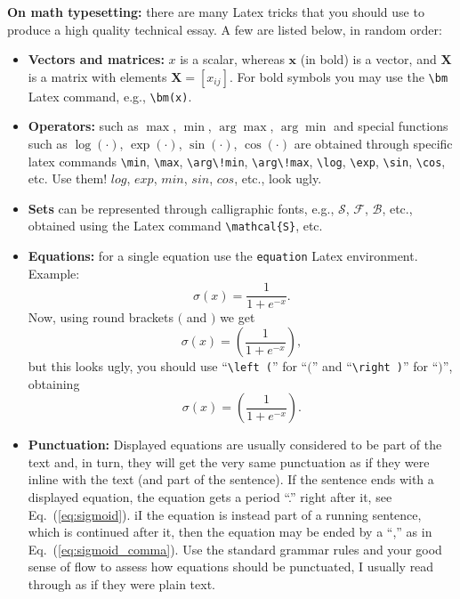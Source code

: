 \noindent \textbf{On math typesetting:} there are many Latex tricks that you should use to produce a high quality technical essay. A few are listed below, in random order:
\begin{itemize}
\item \textbf{Vectors and matrices:} $x$ is a scalar, whereas $\bm{x}$ (in bold) is a vector, and $\bm{X}$ is a matrix with elements $\bm{X} = [x_{ij}]$. For bold symbols you may use the \texttt{\textbackslash bm} Latex command, e.g., \texttt{\textbackslash bm(x)}.
\item \textbf{Operators:} such as $\max$, $\min$, $\arg\!\max$, $\arg\!\min$ and special functions such as $\log(\cdot)$, $\exp(\cdot)$, $\sin(\cdot)$, $\cos(\cdot)$ are obtained through specific latex commands \texttt{\textbackslash min}, \texttt{\textbackslash max}, \texttt{\textbackslash arg\textbackslash!min}, \texttt{\textbackslash arg\textbackslash!max}, \texttt{\textbackslash log}, \texttt{\textbackslash exp}, \texttt{\textbackslash sin}, \texttt{\textbackslash cos}, etc. Use them! $log$, $exp$, $min$, $sin$, $cos$, etc., look ugly.
\item \textbf{Sets} can be represented through calligraphic fonts, e.g., $\mathcal{S}$, $\mathcal{F}$, $\mathcal{B}$, etc., obtained using the Latex command \texttt{\textbackslash mathcal{\{S\}}}, etc.
\item \textbf{Equations:} for a single equation use the \texttt{equation} Latex environment. Example: 
\begin{equation}
\label{eq:sigmoid}
\sigma(x) = \frac{1}{1+e^{-x}}.
\end{equation} 
Now, using round brackets $($ and $)$ we get
\begin{equation}
\label{eq:sigmoid_comma}
\sigma(x) = (\frac{1}{1+e^{-x}}),
\end{equation} 
but this looks ugly, you should use ``\texttt{\textbackslash left (}'' for ``$($'' and ``\texttt{\textbackslash right )}'' for ``$)$'', obtaining
\begin{equation}
\sigma(x) = \left ( \frac{1}{1+e^{-x}} \right ).
\end{equation} 
\item \textbf{Punctuation:} Displayed equations are usually considered to be part of the text and, in turn, they will get the very same punctuation as if they were inline with the text (and part of the sentence). If the sentence ends with a displayed equation, the equation gets a period ``.'' right after it, see Eq.~(\ref{eq:sigmoid}). iI the equation is instead part of a running sentence, which is continued after it, then the equation may be ended by a ``,'' as in Eq.~(\ref{eq:sigmoid_comma}). Use the standard grammar rules and your good sense of flow to assess how equations should be punctuated, I usually read through as if they were plain text.
\end{itemize} 


